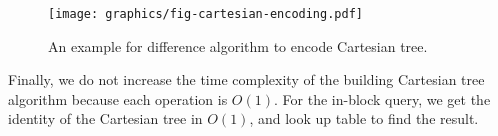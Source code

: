 

\begin{figure*}[!thb]
  \centering
  \texttt{[image: graphics/fig-cartesian-encoding.pdf]}

  \caption{An example for difference algorithm to encode Cartesian tree.}

  \label{fig:cartesianEncoding}
\end{figure*}

Finally, we do not increase the time complexity of the building
Cartesian tree algorithm because each operation is $O(1)$.  For the
in-block query, we get the identity of the Cartesian tree in $O(1)$,
and look up table to find the result.

\iffalse
最後，我們不改變原本的建立笛卡爾樹算法，便能在過程中擭得樹的編號，
每一次的 in-block 詢問只需要一次記憶體存取，得到任一操作攤銷複雜度 $\theta(1)$。
\fi
